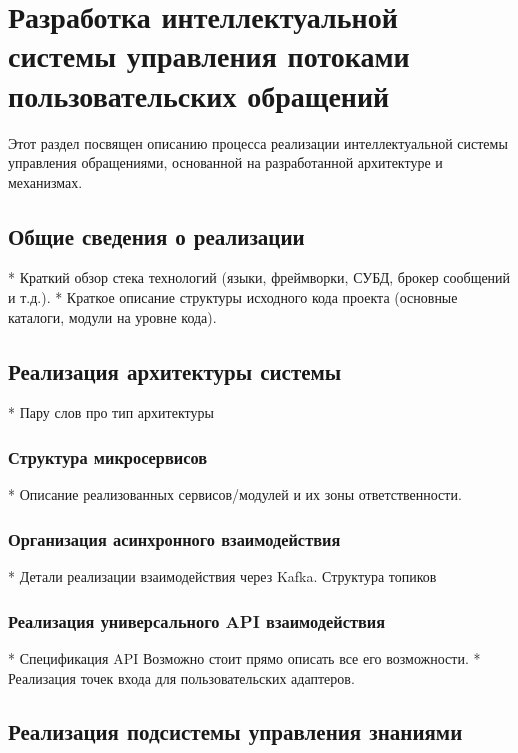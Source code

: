 \section{Разработка интеллектуальной системы управления потоками пользовательских обращений}
\label{sec:development}

Этот раздел посвящен описанию процесса реализации интеллектуальной системы управления обращениями, основанной на разработанной архитектуре и механизмах.

\subsection{Общие сведения о реализации}

*   Краткий обзор стека технологий (языки, фреймворки, СУБД, брокер сообщений и т.д.).
*   Краткое описание структуры исходного кода проекта (основные каталоги, модули на уровне кода).


\subsection{Реализация архитектуры системы}

*   Пару слов про тип архитектуры

\subsubsection{Структура микросервисов}

*   Описание реализованных сервисов/модулей и их зоны ответственности.

\subsubsection{Организация асинхронного взаимодействия}

*   Детали реализации взаимодействия через Kafka. Структура топиков

\subsubsection{Реализация универсального API взаимодействия}

*   Спецификация API Возможно стоит прямо описать все его возможности.
*   Реализация точек входа для пользовательских адаптеров.

\subsection{Реализация подсистемы управления знаниями}


